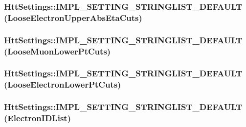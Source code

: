 \label{classHttSettings_a05ff7c3b228a631bc3e5b7a0682a57ce}
\hypertarget{classHttSettings_a3f453bcf3bff04e804c16d9219d23850}{
\subsubsection[{IMPL\_\-SETTING\_\-STRINGLIST\_\-DEFAULT}]{\setlength{\rightskip}{0pt plus 5cm}HttSettings::IMPL\_\-SETTING\_\-STRINGLIST\_\-DEFAULT (LooseElectronUpperAbsEtaCuts)}}
\label{classHttSettings_a3f453bcf3bff04e804c16d9219d23850}
\hypertarget{classHttSettings_af1fc9f51fe6d6291198fd5be598967ee}{
\subsubsection[{IMPL\_\-SETTING\_\-STRINGLIST\_\-DEFAULT}]{\setlength{\rightskip}{0pt plus 5cm}HttSettings::IMPL\_\-SETTING\_\-STRINGLIST\_\-DEFAULT (LooseMuonLowerPtCuts)}}
\label{classHttSettings_af1fc9f51fe6d6291198fd5be598967ee}
\hypertarget{classHttSettings_ad94c7268458dfe8de611c799acca725a}{
\subsubsection[{IMPL\_\-SETTING\_\-STRINGLIST\_\-DEFAULT}]{\setlength{\rightskip}{0pt plus 5cm}HttSettings::IMPL\_\-SETTING\_\-STRINGLIST\_\-DEFAULT (LooseElectronLowerPtCuts)}}
\label{classHttSettings_ad94c7268458dfe8de611c799acca725a}
\hypertarget{classHttSettings_ae9f77a258468ff234e15c2746addbe38}{
\subsubsection[{IMPL\_\-SETTING\_\-STRINGLIST\_\-DEFAULT}]{\setlength{\rightskip}{0pt plus 5cm}HttSettings::IMPL\_\-SETTING\_\-STRINGLIST\_\-DEFAULT (ElectronIDList)}}
